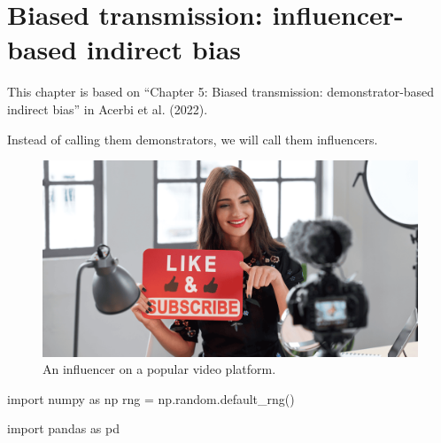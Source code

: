 \documentclass[
  a4paperpaper,
  ,captions=tableheading
]{scrbook}
\newenvironment{Shaded}{\begin{snugshade}}{\end{snugshade}}
\newcommand{\ImportTok}[1]{\textcolor[rgb]{0.00,0.46,0.62}{#1}}
\newcommand{\NormalTok}[1]{\textcolor[rgb]{0.00,0.23,0.31}{#1}}
\newcommand{\OperatorTok}[1]{\textcolor[rgb]{0.37,0.37,0.37}{#1}}
\begin{document}
\hypertarget{sec-demonstrator-biased-transmission}{%
\chapter{Biased transmission: influencer-based indirect
bias}\label{sec-demonstrator-biased-transmission}}

\begin{tcolorbox}[enhanced jigsaw, arc=.35mm, colbacktitle=quarto-callout-note-color!10!white, colback=white, breakable, toprule=.15mm, title=\textcolor{quarto-callout-note-color}{\faInfo}\hspace{0.5em}{Note}, left=2mm, bottomtitle=1mm, toptitle=1mm, leftrule=.75mm, opacitybacktitle=0.6, titlerule=0mm, opacityback=0, rightrule=.15mm, bottomrule=.15mm, coltitle=black, colframe=quarto-callout-note-color-frame]

This chapter is based on ``Chapter 5: Biased transmission:
demonstrator-based indirect bias'' in Acerbi et al. (2022).

\end{tcolorbox}

Instead of calling them demonstrators, we will call them influencers.

\begin{figure}

{\centering \includegraphics{img/influencer.png}

}

\caption{An influencer on a popular video platform.}

\end{figure}

\begin{Shaded}
\begin{Highlighting}[]
\ImportTok{import}\NormalTok{ numpy }\ImportTok{as}\NormalTok{ np }
\NormalTok{rng }\OperatorTok{=}\NormalTok{ np.random.default\_rng()}

\ImportTok{import}\NormalTok{ pandas }\ImportTok{as}\NormalTok{ pd}
\end{Highlighting}
\end{Shaded}
\end{document}
